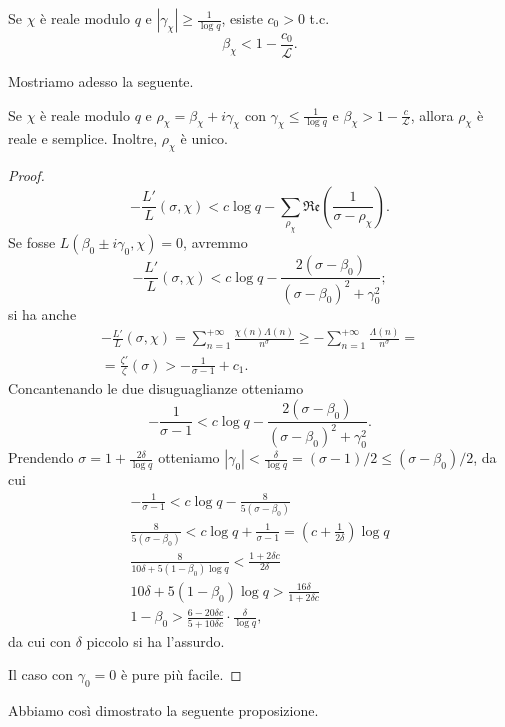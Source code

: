 \begin{prop}
  Se $\chi$ è reale modulo $q$ e $|\gamma_\chi| \ge \frac{1}{\log{q}}$, esiste $c_0>0$ t.c.
  $$\beta_\chi<1-\frac{c_0}{\mathcal{L}}.$$
\end{prop}

Mostriamo adesso la seguente.

\begin{prop}
  Se $\chi$ è reale modulo $q$ e $\rho_\chi=\beta_\chi+i\gamma_\chi$ con $\gamma_\chi \le \frac{1}{\log{q}}$ e $\beta_\chi>1-\frac{c}{\mathcal{L}}$, allora $\rho_\chi$ è reale e semplice. Inoltre, $\rho_\chi$ è unico.
\end{prop}

\begin{proof}
  $$-\frac{L'}{L}(\sigma,\chi)<c\log{q}-\sum_{\rho_\chi} \mathfrak{Re}\left(\frac{1}{\sigma-\rho_\chi}\right).$$
  Se fosse $L(\beta_0\pm i\gamma_0,\chi)=0$, avremmo
  $$-\frac{L'}{L}(\sigma,\chi)<c\log{q}-\frac{2(\sigma-\beta_0)}{(\sigma-\beta_0)^2+\gamma_0^2};$$
  si ha anche
  \begin{gather*}
    -\frac{L'}{L}(\sigma,\chi)=\sum_{n=1}^{+\infty} \frac{\chi(n)\Lambda(n)}{n^{\sigma}} \ge -\sum_{n=1}^{+\infty} \frac{\Lambda(n)}{n^{\sigma}}= \\
    =\frac{\zeta'}{\zeta}(\sigma)>-\frac{1}{\sigma-1}+c_1.
  \end{gather*}
  Concantenando le due disuguaglianze otteniamo
  $$-\frac{1}{\sigma-1}<c\log{q}-\frac{2(\sigma-\beta_0)}{(\sigma-\beta_0)^2+\gamma_0^2}.$$
  Prendendo $\sigma=1+\frac{2\delta}{\log{q}}$ otteniamo $|\gamma_0|<\frac{\delta}{\log{q}}=(\sigma-1)/2 \le (\sigma-\beta_0)/2$, da cui
  \begin{gather*}
    -\frac{1}{\sigma-1}<c\log{q}-\frac{8}{5(\sigma-\beta_0)} \\
    \frac{8}{5(\sigma-\beta_0)}<c\log{q}+\frac{1}{\sigma-1}=\left(c+\frac{1}{2\delta}\right)\log{q} \\
    \frac{8}{10\delta+5(1-\beta_0)\log{q}}<\frac{1+2\delta c}{2\delta} \\
    10\delta+5(1-\beta_0)\log{q}>\frac{16\delta}{1+2\delta c} \\
    1-\beta_0>\frac{6-20\delta c}{5+10\delta c}\cdot \frac{\delta}{\log{q}},
  \end{gather*}
  da cui con $\delta$ piccolo si ha l'assurdo.

  Il caso con $\gamma_0=0$ è pure più facile.
\end{proof}

Abbiamo così dimostrato la seguente proposizione.

